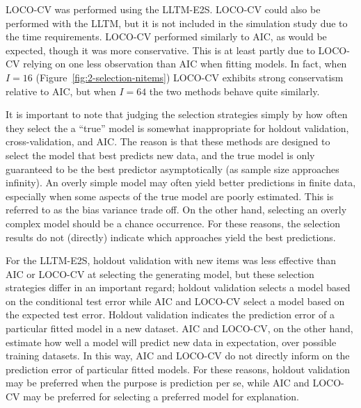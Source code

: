 LOCO-CV was performed using the LLTM-E2S. LOCO-CV could also be performed with the LLTM, but it is not included in the simulation study due to the time requirements. LOCO-CV performed similarly to AIC, as would be expected, though it was more conservative. This is at least partly due to LOCO-CV relying on one less observation than AIC when fitting models. In fact, when $I = 16$ (Figure~\ref{fig:2-selection-nitems}) LOCO-CV exhibits strong conservatism relative to AIC, but when $I=64$ the two methods behave quite similarly.

It is important to note that judging the selection strategies simply by how often they select the a ``true'' model is somewhat inappropriate for holdout validation, cross-validation, and AIC. The reason is that these methods are designed to select the model that best predicts new data, and the true model is only guaranteed to be the best predictor asymptotically (as sample size approaches infinity). An overly simple model may often yield better predictions in finite data, especially when some aspects of the true model are poorly estimated. This is referred to as the bias variance trade off. On the other hand, selecting an overly complex model should be a chance occurrence. For these reasons, the selection results do not (directly) indicate which approaches yield the best predictions. 

For the LLTM-E2S, holdout validation with new items was less effective than AIC or LOCO-CV at selecting the generating model, but these selection strategies differ in an important regard; holdout validation selects a model based on the conditional test error while AIC and LOCO-CV select a model based on the expected test error. Holdout validation indicates the prediction error of a particular fitted model in a new dataset. 
AIC and LOCO-CV, on the other hand, estimate how well a model will predict new data in expectation, over possible training datasets. In this way, AIC and LOCO-CV do not directly inform on the prediction error of particular fitted models. For these reasons, holdout validation may be preferred when the purpose is prediction per se, while AIC and LOCO-CV may be preferred for selecting a preferred model for explanation.

